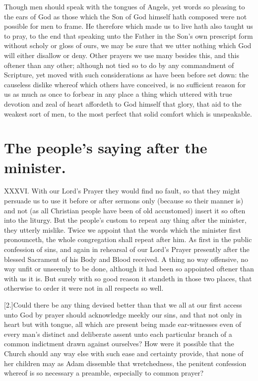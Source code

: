 Though men should speak with the tongues of Angels, yet  words so pleasing to the ears of God as those which the Son of God himself hath composed were not possible for men to frame.
 He therefore which made us to live hath also taught us to pray, to the end that speaking unto the Father in the Son’s own prescript form without scholy or gloss of ours, we may be sure that we utter nothing which God will either disallow or deny. Other prayers we use many besides this, and this oftener than any other; although not tied so to do by any commandment of Scripture, yet moved with such considerations as have been before set down: the causeless dislike whereof which others have conceived, is no sufficient reason for us as much as once to forbear in any place a thing which uttered with true devotion and zeal of heart affordeth to God himself that glory, that aid to the weakest sort of men, to the most perfect that solid comfort which is unspeakable.


\section*{The people’s saying after the minister.}
XXXVI. With our Lord’s Prayer they would find no fault, so that they might persuade us to use it before or after sermons only (because so their manner is) and not (as all Christian people have been of old accustomed) insert it so often into the liturgy. But the people’s custom to repeat any thing after the minister, they utterly mislike. Twice we appoint that the words which the minister first pronounceth, the whole congregation shall repeat after him. As first in the public confession of sins, and again in rehearsal of our Lord’s Prayer presently after the blessed Sacrament of his  Body and Blood received.
 A thing no way offensive, no way unfit or unseemly to be done, although it had been so appointed oftener than with us it is. But surely with so good reason it standeth in those two places, that otherwise to order it were not in all respects so well.

[2.]Could there be any thing devised better than that we all at our first access unto God by prayer should acknowledge meekly our sins, and that not only in heart but with tongue, all which are present being made ear-witnesses even of every man’s distinct and deliberate assent unto each particular branch of a common indictment drawn against ourselves? How were it possible that the Church should any way else with such ease and certainty provide, that none of her children may as Adam dissemble that wretchedness, the penitent confession whereof is so necessary a preamble, especially to common prayer?

